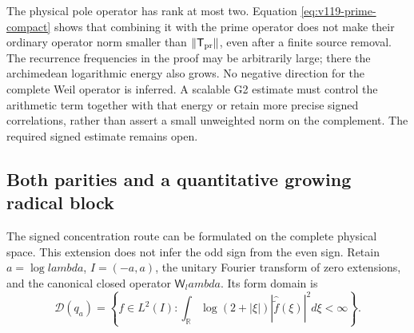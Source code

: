 \documentclass[11pt]{article}
\def\lambda{lambda}%
\theoremstyle{remark}
\begin{document}
The physical pole operator has rank at most two.  Equation
\eqref{eq:v119-prime-compact} shows that combining it with the prime
operator does not make their ordinary operator norm smaller than
$\|\mathsf T_{\rm pr}\|$, even after a finite source removal.
The recurrence frequencies in the proof may be arbitrarily large;
there the archimedean logarithmic energy also grows.  No negative
direction for the complete Weil operator is inferred.  A scalable G2
estimate must control the arithmetic term together with that energy
or retain more precise signed correlations, rather than assert a small
unweighted norm on the complement.  The required signed estimate
remains open.


\subsection{Both parities and a quantitative growing radical block}

The signed concentration route can be formulated on the complete physical
space.  This extension does not infer the odd sign from the even sign.
Retain $a=\log\lambda$, $I=(-a,a)$, the unitary Fourier transform of
zero extensions, and the canonical closed operator $\mathsf W_\lambda$.
Its form domain is
\[
 \mathcal D(q_a)=\left\{f\in L^2(I):
 \int_{\mathbb R}\log(2+|\xi|)
       |\widehat{\widetilde f}(\xi)|^2d\xi<\infty\right\}.
\]
\end{document}
